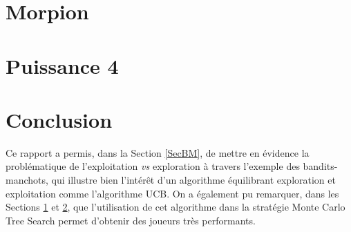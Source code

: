 \documentclass[a4paper,12pt]{article}
\begin{document}
\section{Morpion}
\label{SecMorpion}

\section{Puissance 4}
\label{SecPuissance4}

\section{Conclusion}

Ce rapport a permis, dans la Section \ref{SecBM}, de mettre en évidence la problématique de l'exploitation \emph{vs} exploration à travers l'exemple des bandits-manchots, qui illustre bien l'intérêt d'un algorithme équilibrant exploration et exploitation comme l'algorithme UCB. On a également pu remarquer, dans les Sections \ref{SecMorpion} et \ref{SecPuissance4}, que l'utilisation de cet algorithme dans la stratégie Monte Carlo Tree Search permet d'obtenir des joueurs très performants.
\end{document}
